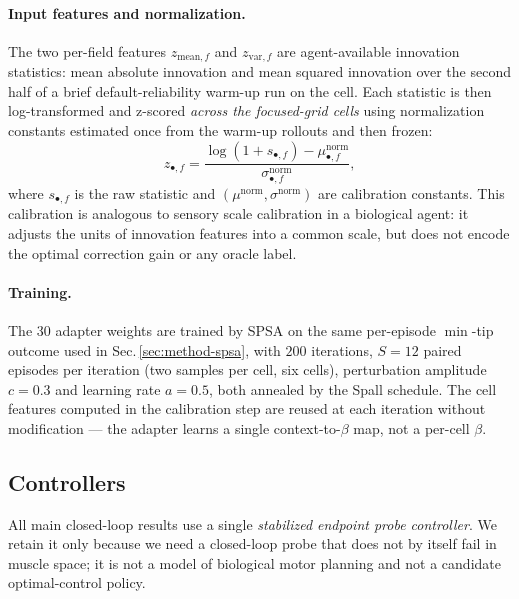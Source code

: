 \documentclass[sn-mathphys,NameDate,iicol]{sn-jnl}
\begin{document}
\paragraph{Input features and normalization.}
The two per-field features $z_{\mathrm{mean},f}$ and
$z_{\mathrm{var},f}$ are agent-available innovation statistics:
mean absolute innovation and mean squared innovation over the
second half of a brief default-reliability warm-up run on the cell.
Each statistic is then log-transformed and z-scored \emph{across the
focused-grid cells} using normalization constants estimated once
from the warm-up rollouts and then frozen:
\begin{equation}
z_{\bullet,f}
 = \frac{\log(1 + s_{\bullet,f}) - \mu_{\bullet,f}^{\mathrm{norm}}}
 {\sigma_{\bullet,f}^{\mathrm{norm}}},
\end{equation}
where $s_{\bullet,f}$ is the raw statistic and
$(\mu^{\mathrm{norm}}, \sigma^{\mathrm{norm}})$ are calibration
constants. This calibration is analogous to sensory scale
calibration in a biological agent: it adjusts the units of
innovation features into a common scale, but does not encode the
optimal correction gain or any oracle label.

\paragraph{Training.}
The 30 adapter weights are trained by SPSA on the same per-episode
$\min$-tip outcome used in Sec.\,\ref{sec:method-spsa}, with
$200$ iterations, $S\!=\!12$ paired episodes per iteration (two
samples per cell, six cells), perturbation amplitude $c\!=\!0.3$
and learning rate $a\!=\!0.5$, both annealed by the Spall schedule.
The cell features computed in the calibration step are reused at
each iteration without modification --- the adapter learns a single
context-to-$\beta$ map, not a per-cell $\beta$.

\subsection{Controllers}
\label{sec:method-controller}
All main closed-loop results use a single \emph{stabilized endpoint probe
controller}. We retain it only because we need a closed-loop probe
that does not by itself fail in muscle space; it is not a model of
biological motor planning and not a candidate optimal-control policy.
\end{document}
